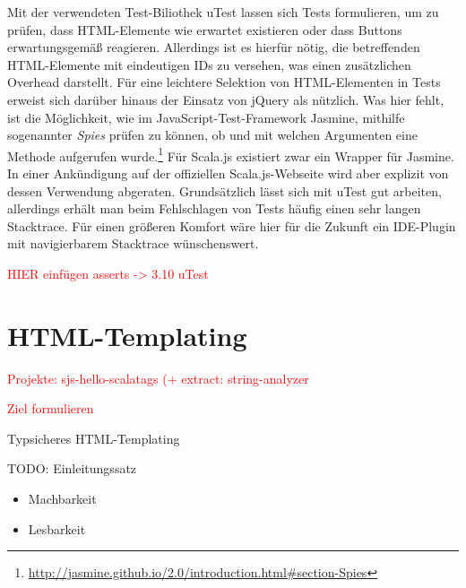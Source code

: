 \documentclass[a4paper, 12pt, hidelinks, listof=totoc, listoftables=totoc, bibliography=totoc]{scrreprt}
\newcommand{\TODO}[1]{\textcolor{red}{#1}\newline}
\begin{document}
Mit der verwendeten Test-Biliothek uTest lassen sich Tests formulieren, um zu prüfen, dass HTML-Elemente wie erwartet existieren oder dass Buttons erwartungsgemäß reagieren. Allerdings ist es hierfür nötig, die betreffenden HTML-Elemente mit eindeutigen IDs zu versehen, was einen zusätzlichen Overhead darstellt. Für eine leichtere Selektion von HTML-Elementen in Tests erweist sich darüber hinaus der Einsatz von jQuery als nützlich. Was hier fehlt, ist die Möglichkeit, wie im JavaScript-Test-Framework Jasmine, mithilfe sogenannter \emph{Spies} prüfen zu können, ob und mit welchen Argumenten eine Methode aufgerufen wurde.\footnote{\url{http://jasmine.github.io/2.0/introduction.html\#section-Spies}} Für Scala.js existiert zwar ein Wrapper für Jasmine. In einer Ankündigung auf der offiziellen Scala.js-Webseite\cite{scalajs.ASJ} wird aber explizit von dessen Verwendung abgeraten. Grundsätzlich lässt sich mit uTest gut arbeiten, allerdings erhält man beim Fehlschlagen von Tests häufig einen sehr langen Stacktrace. Für einen größeren Komfort wäre hier für die Zukunft ein IDE-Plugin mit navigierbarem Stacktrace wünschenswert.

\TODO{HIER einfügen asserts -> 3.10 uTest}



\section{HTML-Templating}


\TODO{Projekte: sjs-hello-scalatags (+ extract: string-analyzer}


\TODO{Ziel formulieren}

Typsicheres HTML-Templating 

TODO: Einleitungssatz


\begin{itemize}
	\item Machbarkeit
	\item Lesbarkeit
\end{itemize}
\end{document}
